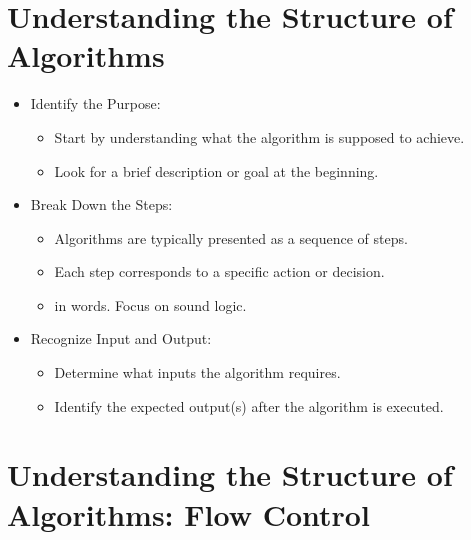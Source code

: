 \documentclass[
  letterpaper,
  DIV=11,
  numbers=noendperiod]{scrreprt}
\providecommand{\tightlist}{%
  \setlength{\itemsep}{0pt}\setlength{\parskip}{0pt}}\usepackage{longtable,booktabs,array}
\begin{document}
\section{Understanding the Structure of
Algorithms}\label{understanding-the-structure-of-algorithms}

\begin{itemize}
\tightlist
\item
  Identify the Purpose:

  \begin{itemize}
  \tightlist
  \item
    Start by understanding what the algorithm is supposed to achieve.
  \item
    Look for a brief description or goal at the beginning.
  \end{itemize}
\item
  Break Down the Steps:

  \begin{itemize}
  \tightlist
  \item
    Algorithms are typically presented as a sequence of steps.
  \item
    Each step corresponds to a specific action or decision.
  \item
    in words. Focus on sound logic.
  \end{itemize}
\item
  Recognize Input and Output:

  \begin{itemize}
  \tightlist
  \item
    Determine what inputs the algorithm requires.
  \item
    Identify the expected output(s) after the algorithm is executed.
  \end{itemize}
\end{itemize}

\section{Understanding the Structure of Algorithms: Flow
Control}\label{understanding-the-structure-of-algorithms-flow-control}
\end{document}
